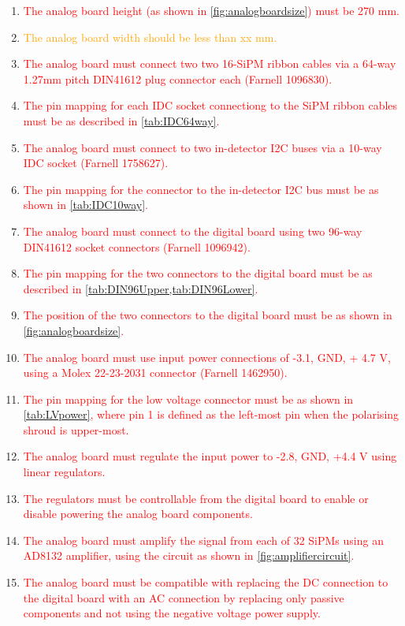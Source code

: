 \documentclass[a4paper]{article}
\newcommand{\must}[1]{\textcolor{red}{#1}}
\newcommand{\should}[1]{\textcolor{orange}{#1}}
\begin{document}
\begin{enumerate}
    \item \must{The analog board height (as shown in \cref{fig:analogboardsize}) must be 270 mm.}
    \item \should{The analog board width should be less than xx mm.}
    \item \must{The analog board must connect two two 16-SiPM ribbon cables via a 64-way 1.27mm pitch DIN41612 plug connector each (Farnell 1096830).}
    \item \must{The pin mapping for each IDC socket connectiong to the SiPM ribbon cables must be as described in \cref{tab:IDC64way}.}
    \item \must{The analog board must connect to two in-detector I2C buses via a 10-way IDC socket (Farnell 1758627).}
    \item \must{The pin mapping for the connector to the in-detector I2C bus must be as shown in \cref{tab:IDC10way}.}
    \item \must{The analog board must connect to the digital board using two 96-way DIN41612 socket connectors (Farnell 1096942).}
    \item \must{The pin mapping for the two connectors to the digital board must be as described in \cref{tab:DIN96Upper,tab:DIN96Lower}.}
    \item \must{The position of the two connectors to the digital board must be as shown in \cref{fig:analogboardsize}.}
    \item \must{The analog board must use input power connections of -3.1, GND, + 4.7 V, using a Molex 22-23-2031 connector (Farnell 1462950).}
    \item \must{The pin mapping for the low voltage connector must be as shown in \cref{tab:LVpower}, where pin 1 is defined as the left-most pin when the polarising shroud is upper-most.}
    \item \must{The analog board must regulate the input power to -2.8, GND, +4.4 V using linear regulators.}
    \item \must{The regulators must be controllable from the digital board to enable or disable powering the analog board components.}
    \item \must{The analog board must amplify the signal from each of 32 SiPMs using an AD8132 amplifier, using the circuit as shown in \cref{fig:amplifiercircuit}.}
    \item \must{The analog board must be compatible with replacing the DC connection to the digital board with an AC connection by replacing only passive components and not using the negative voltage power supply.}

\end{enumerate}
\end{document}
